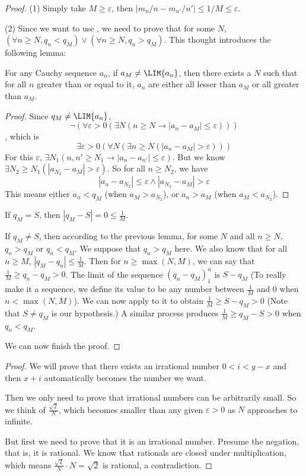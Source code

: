 \begin{proof}
(1) Simply take $M \geq \varepsilon$, then $|m_n/n-m_{n'}/n'|\leq 1/M\leq \varepsilon$.

(2)
Since we want to use , we need to prove that for some $N$, $(\forall n \geq N, q_n < q_M) \vee (\forall n \geq N, q_n > q_M)$. This thought introduces the following lemma:
\begin{lem}
For any Cauchy sequence $a_n$, if $a_M \neq \LIM{a_n}$, then there exists a $N$ such that for all $n$ greater than or equal to it, $a_n$ are either all lesser than $a_M$ or all greater than $a_M$.
\end{lem}
\begin{proof}
Since $q_M \neq \LIM{a_n}$,
\[
\neg (\forall \varepsilon>0(\exists N(n\geq N \to |a_n-a_M| \leq \varepsilon) ))
\]
, which is
\[
\exists \varepsilon >0 (\forall N(\exists n\geq N(|a_n-a_M| > \varepsilon)))
\]
For this $\varepsilon$, $\exists N_1(n,n'\geq N_1 \to |a_n-a_{n'}| \leq \varepsilon)$. But we know $\exists N_2 \geq N_1(|a_{N_2}-a_M| > \varepsilon)$. So for all $n \geq N_2$, we have
\[
|a_n-a_{N_2}| \leq \varepsilon \wedge |a_{N_2} - a_M| > \varepsilon
\]
This means either $a_n < q_{M}$ (when $a_M > a_{N_2}$), or $a_n > a_{M}$ (when $a_M < a_{N_2}$).
\end{proof}

If $q_M = S$, then $|q_M-S| = 0 \leq \frac{1}{M}$.

If $q_M \neq S$, then according to the previous lemma, for some $N$ and all $n\geq N$, $q_n > q_M$ or $q_n<q_M$. We suppose that $q_n > q_M$ here. We also know that for all $n\geq M$, $|q_M - q_n| \leq \frac{1}{M}$. Then for $n \geq \max(N,M)$, we can say that $\frac{1}{M} \geq q_n - q_M >0$. The limit of the sequence $(q_n-q_M)_1^n$ is $S-q_M$ (To really make it a sequence, we define its value to be any number between $\frac{1}{M}$ and 0 when $n < \max(N,M)$). We can now apply  to it to obtain $\frac{1}{M}\geq S-q_M >0$ (Note that $S \neq q_M$ is our hypothesis.) A similar process produces $\frac{1}{M}\geq q_M-S >0$ when $q_n<q_M$. 

We can now finish the proof.
\end{proof}

\begin{proof}
We will prove that there exists an irrational number $0<i<y-x$ and then $x+i$ automatically becomes the number we want.

Then we only need to prove that irrational numbers can be arbitrarily small. So we think of $\frac{\sqrt{2}}{N}$, which becomes smaller than any given $\varepsilon>0$ as $N$ approaches to infinite.

But first we need to prove that it is an irrational number. Presume the negation, that is, it is rational. We know that rationals are closed under multiplication, which means $\frac{\sqrt{2}}{N} \cdot N = \sqrt{2}$ is rational, a contradiction.
\end{proof}

